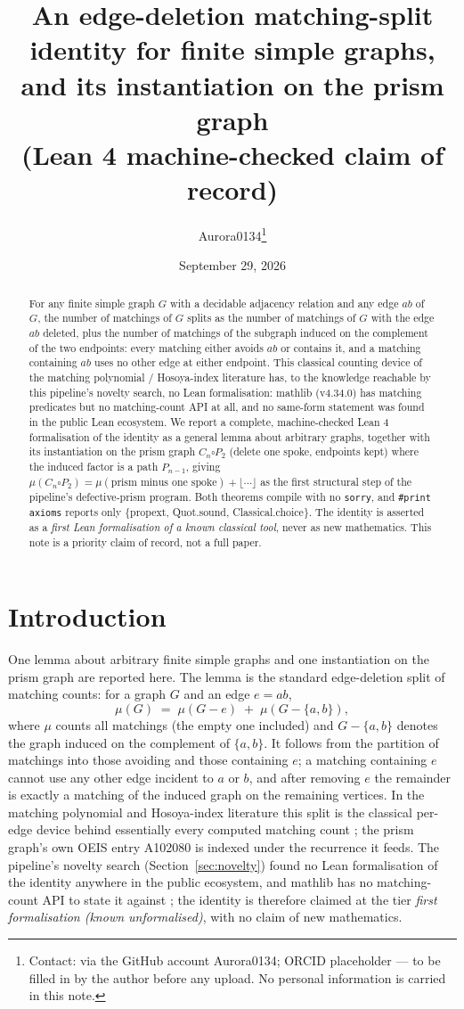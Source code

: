 \documentclass[11pt]{article}
\title{An edge-deletion matching-split identity for finite simple graphs, and
its instantiation on the prism graph\\ (Lean 4 machine-checked claim of
record)}
\author{Aurora0134\thanks{Contact: via the GitHub account Aurora0134; ORCID
placeholder --- to be filled in by the author before any upload. No personal
information is carried in this note.}}
\date{September 29, 2026}
\theoremstyle{definition}
\begin{document}
\maketitle

\begin{abstract}
For any finite simple graph $G$ with a decidable adjacency relation and any
edge $ab$ of $G$, the number of matchings of $G$ splits as the number of
matchings of $G$ with the edge $ab$ deleted, plus the number of matchings of
the subgraph induced on the complement of the two endpoints: every matching
either avoids $ab$ or contains it, and a matching containing $ab$ uses no other
edge at either endpoint. This classical counting device of the matching
polynomial / Hosoya-index literature has, to the knowledge reachable by this
pipeline's novelty search, no Lean formalisation: mathlib (v4.34.0) has
matching predicates but no matching-count API at all, and no same-form
statement was found in the public Lean ecosystem. We report a complete,
machine-checked Lean 4 formalisation of the identity as a general lemma about
arbitrary graphs, together with its instantiation on the prism graph
$C_n\square P_2$ (delete one spoke, endpoints kept) where the induced factor is
a path $P_{n-1}$, giving $\mu(C_n\square P_2)=\mu(\text{prism minus one
spoke})+\lfloor \cdots \rfloor$ as the first structural step of the pipeline's
defective-prism program. Both theorems compile with no \texttt{sorry}, and
\texttt{\#print axioms} reports only \{propext, Quot.sound,
Classical.choice\}. The identity is asserted as a \emph{first Lean
formalisation of a known classical tool}, never as new mathematics. This note
is a priority claim of record, not a full paper.
\end{abstract}

\section{Introduction}

One lemma about arbitrary finite simple graphs and one instantiation on the
prism graph are reported here. The lemma is the standard edge-deletion split
of matching counts: for a graph $G$ and an edge $e=ab$,
\[
\mu(G)\;=\;\mu(G-e)\;+\;\mu(G-\{a,b\}),
\]
where $\mu$ counts all matchings (the empty one included) and $G-\{a,b\}$
denotes the graph induced on the complement of $\{a,b\}$. It follows from the
partition of matchings into those avoiding and those containing $e$; a
matching containing $e$ cannot use any other edge incident to $a$ or $b$, and
after removing $e$ the remainder is exactly a matching of the induced graph on
the remaining vertices. In the matching polynomial and Hosoya-index
literature this split is the classical per-edge device behind essentially
every computed matching count \cite{godsil-gutman}; the prism graph's own OEIS
entry A102080 \cite{a102080} is indexed under the recurrence it feeds. The
pipeline's novelty search (Section~\ref{sec:novelty}) found no Lean
formalisation of the identity anywhere in the public ecosystem, and mathlib
has no matching-count API to state it against \cite{mathlib}; the identity is
therefore claimed at the tier \emph{first formalisation (known unformalised)},
with no claim of new mathematics.
\end{document}
